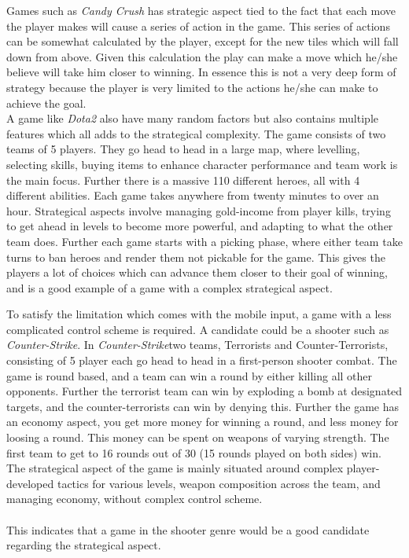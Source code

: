 Games such as \textit{Candy Crush} has strategic aspect tied to the fact that each move the player makes will cause a series of action in the game.
This series of actions can be somewhat calculated by the player, except for the new tiles which will fall down from above.
Given this calculation the play can make a move which he/she believe will take him closer to winning.
In essence this is not a very deep form of strategy because the player is very limited to the actions he/she can make to achieve the goal.\\
A game like \textit{Dota2} also have many random factors but also contains multiple features which all adds to the strategical complexity.
The game consists of two teams of 5 players. They go head to head in a large map, where levelling, selecting skills, buying items to enhance character performance and team work is the main focus. Further there is a massive 110 different heroes, all with 4 different abilities. Each game takes anywhere from twenty minutes to over an hour. 
Strategical aspects involve managing gold-income from player kills, trying to get ahead in levels to become more powerful, and adapting to what the other team does. Further each game starts with a picking phase, where either team take turns to ban heroes and render them not pickable for the game.   
This gives the players a lot of choices which can advance them closer to their goal of winning, and is a good example of a game with a complex strategical aspect.

To satisfy the limitation which comes with the mobile input, a game with a less complicated control scheme is required.
A candidate could be a shooter such as \textit{Counter-Strike}.
In \textit{Counter-Strike}two teams, Terrorists and Counter-Terrorists, consisting of 5 player each go head to head in a first-person shooter combat. The game is round based, and a team can win a round by either killing all other opponents. Further the terrorist team can win by exploding a bomb at designated targets, and the counter-terrorists can win by denying this. Further the game has an economy aspect, you get more money for winning a round, and less money for loosing a round. This money can be spent on weapons of varying strength. 
The first team to get to 16 rounds out of 30 (15 rounds played on both sides) win. 
The strategical aspect of the game is mainly situated around complex player-developed tactics for various levels, weapon composition across the team, and managing economy, without complex control scheme.\\\\
This indicates that a game in the shooter genre would be a good candidate regarding the strategical aspect.

